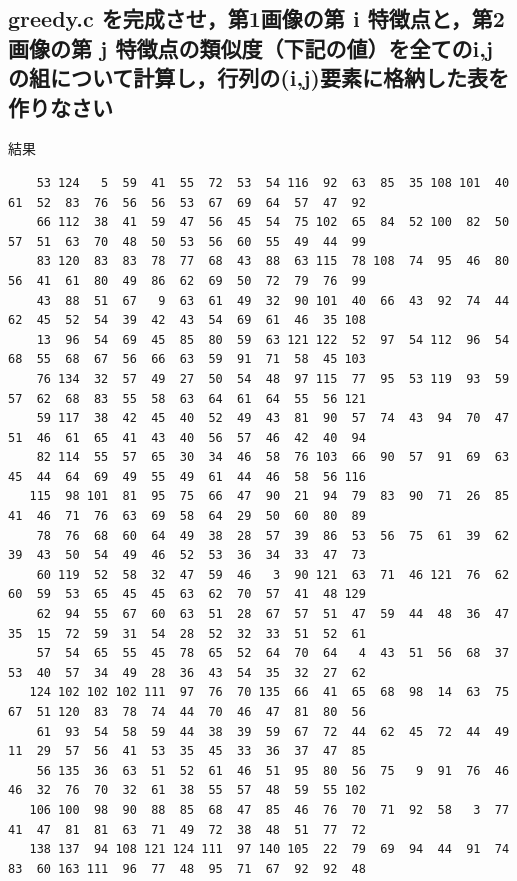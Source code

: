 \documentclass[11pt]{jarticle}
\begin{document}
\subsection{greedy.c を完成させ，第1画像の第 i 特徴点と，第2画像の第 j 特徴点の類似度（下記の値）を全てのi,jの組について計算し，行列の(i,j)要素に格納した表を作りなさい}
結果
\tiny
\begin{verbatim}
    53 124   5  59  41  55  72  53  54 116  92  63  85  35 108 101  40  61  52  83  76  56  56  53  67  69  64  57  47  92 
    66 112  38  41  59  47  56  45  54  75 102  65  84  52 100  82  50  57  51  63  70  48  50  53  56  60  55  49  44  99 
    83 120  83  83  78  77  68  43  88  63 115  78 108  74  95  46  80  56  41  61  80  49  86  62  69  50  72  79  76  99 
    43  88  51  67   9  63  61  49  32  90 101  40  66  43  92  74  44  62  45  52  54  39  42  43  54  69  61  46  35 108 
    13  96  54  69  45  85  80  59  63 121 122  52  97  54 112  96  54  68  55  68  67  56  66  63  59  91  71  58  45 103 
    76 134  32  57  49  27  50  54  48  97 115  77  95  53 119  93  59  57  62  68  83  55  58  63  64  61  64  55  56 121 
    59 117  38  42  45  40  52  49  43  81  90  57  74  43  94  70  47  51  46  61  65  41  43  40  56  57  46  42  40  94 
    82 114  55  57  65  30  34  46  58  76 103  66  90  57  91  69  63  45  44  64  69  49  55  49  61  44  46  58  56 116 
   115  98 101  81  95  75  66  47  90  21  94  79  83  90  71  26  85  41  46  71  76  63  69  58  64  29  50  60  80  89 
    78  76  68  60  64  49  38  28  57  39  86  53  56  75  61  39  62  39  43  50  54  49  46  52  53  36  34  33  47  73 
    60 119  52  58  32  47  59  46   3  90 121  63  71  46 121  76  62  60  59  53  65  45  45  63  62  70  57  41  48 129 
    62  94  55  67  60  63  51  28  67  57  51  47  59  44  48  36  47  35  15  72  59  31  54  28  52  32  33  51  52  61 
    57  54  65  55  45  78  65  52  64  70  64   4  43  51  56  68  37  53  40  57  34  49  28  36  43  54  35  32  27  62 
   124 102 102 102 111  97  76  70 135  66  41  65  68  98  14  63  75  67  51 120  83  78  74  44  70  46  47  81  80  56 
    61  93  54  58  59  44  38  39  59  67  72  44  62  45  72  44  49  11  29  57  56  41  53  35  45  33  36  37  47  85 
    56 135  36  63  51  52  61  46  51  95  80  56  75   9  91  76  46  46  32  76  70  32  61  38  55  57  48  59  55 102 
   106 100  98  90  88  85  68  47  85  46  76  70  71  92  58   3  77  41  47  81  81  63  71  49  72  38  48  51  77  72 
   138 137  94 108 121 124 111  97 140 105  22  79  69  94  44  91  74  83  60 163 111  96  77  48  95  71  67  92  92  48 

\end{verbatim}
\end{document}

